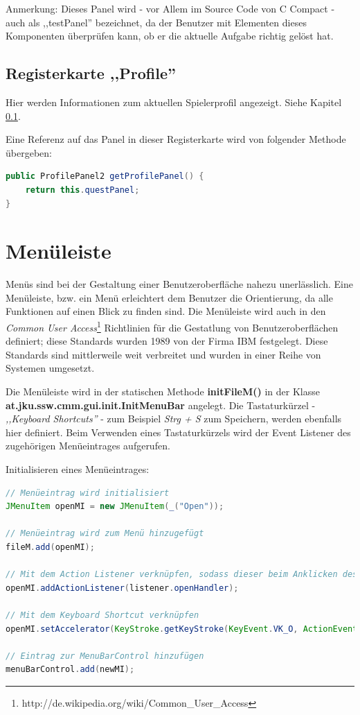 Anmerkung: Dieses Panel wird - vor Allem im Source Code von C Compact - auch als ,,testPanel'' bezeichnet, da der Benutzer mit Elementen dieses Komponenten überprüfen kann, ob er die aktuelle Aufgabe richtig gelöst hat.

\subsection{Registerkarte ,,Profile''}
Hier werden Informationen zum aktuellen Spielerprofil angezeigt. Siehe Kapitel \ref{}.

Eine Referenz auf das Panel in dieser Registerkarte wird von folgender Methode übergeben:
\begin{lstlisting}[language=JAVA]
public ProfilePanel2 getProfilePanel() {
	return this.questPanel;
}
\end{lstlisting}

\section{Menüleiste}
\label{sec:gui-main-menu}
Menüs sind bei der Gestaltung einer Benutzeroberfläche nahezu unerlässlich. Eine Menüleiste, bzw. ein Menü erleichtert dem Benutzer die Orientierung, da alle Funktionen auf einen Blick zu finden sind. Die Menüleiste wird auch in den \emph{Common User Access}\footnote{http://de.wikipedia.org/wiki/Common\_User\_Access} Richtlinien für die Gestatlung von Benutzeroberflächen definiert; diese Standards wurden 1989 von der Firma IBM festgelegt. Diese Standards sind mittlerweile weit verbreitet und wurden in einer Reihe von Systemen umgesetzt.

Die Menüleiste wird in der statischen Methode \textbf{initFileM()} in der Klasse \textbf{at.jku.ssw.cmm.gui.init.InitMenuBar} angelegt. Die Tastaturkürzel - \emph{,,Keyboard Shortcuts''} - zum Beispiel \emph{Strg + S} zum Speichern, werden ebenfalls hier definiert. Beim Verwenden eines Tastaturkürzels wird der Event Listener des zugehörigen Menüeintrages aufgerufen.

Initialisieren eines Menüeintrages:
\begin{lstlisting}[language=JAVA]
// Menüeintrag wird initialisiert
JMenuItem openMI = new JMenuItem(_("Open"));

// Menüeintrag wird zum Menü hinzugefügt
fileM.add(openMI);

// Mit dem Action Listener verknüpfen, sodass dieser beim Anklicken des Menüs aufgerufen wird
openMI.addActionListener(listener.openHandler);

// Mit dem Keyboard Shortcut verknüpfen
openMI.setAccelerator(KeyStroke.getKeyStroke(KeyEvent.VK_O, ActionEvent.CTRL_MASK));

// Eintrag zur MenuBarControl hinzufügen
menuBarControl.add(newMI);
\end{lstlisting}

